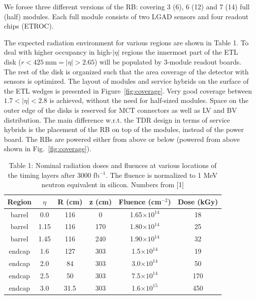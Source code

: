\documentclass[11pt]{article}
\begin{document}
We forsee three different versions of the RB: covering 3 (6), 6 (12) and 7 (14) full (half) modules.
Each full module consists of two LGAD sensors and four readout chips (ETROC).

The expected radiation environment for various regions are shown in Table 1.
To deal with higher occupancy in high-$|\eta|$ regions the innermost part of the ETL disk ($r<425~\mathrm{mm} = |\eta|>2.65$) will be populated by 3-module readout boards.
The rest of the disk is organized such that the area coverage of the detector with sensors is optimized.
The layout of modules and service hybrids on the surface of the ETL wedges is presented in Figure~\ref{fig:coverage}.
Very good coverage between $1.7<|\eta|<2.8$ is achieved, without the need for half-sized modules.
Space on the outer edge of the disks is reserved for MCT connectors as well as LV and BV distribution.
The main difference w.r.t. the TDR design in terms of service hybrids is the placement of the RB on top of the modules, instead of the power board.
The RBs are powered either from above or below (powered from above shown in Fig.~\ref{fig:coverage}).

\begin{table}
  \centering
  \caption{Table 1: Nominal radiation doses and fluences at various locations of the timing layers after 3000 fb$^{-1}$. The fluence is normalized to 1 MeV neutron equivalent in silicon.
  Numbers from [1]}
  \label{table:radiationField}
  \begin{tabular}{ c c c c c c }
    Region & $\eta$ & R (cm) & z (cm) & Fluence (cm$^{-2}$) & Dose (kGy) \\
    \midrule
    barrel & 0.0    & 116    & 0      & 1.65$\times 10^{14}$ & 18         \\
    barrel & 1.15   & 116    & 170    & 1.80$\times 10^{14}$ & 25         \\
    barrel & 1.45   & 116    & 240    & 1.90$\times 10^{14}$ & 32         \\
    endcap & 1.6    & 127    & 303    & 1.5$\times 10^{14}$ & 19         \\
    endcap & 2.0    & 84     & 303    & 3.0$\times 10^{14}$ & 50         \\
    endcap & 2.5    & 50     & 303    & 7.5$\times 10^{14}$ & 170        \\
    endcap & 3.0    & 31.5   & 303    & 1.6$\times 10^{15}$ & 450        \\
  \end{tabular}
\end{table}
\end{document}
